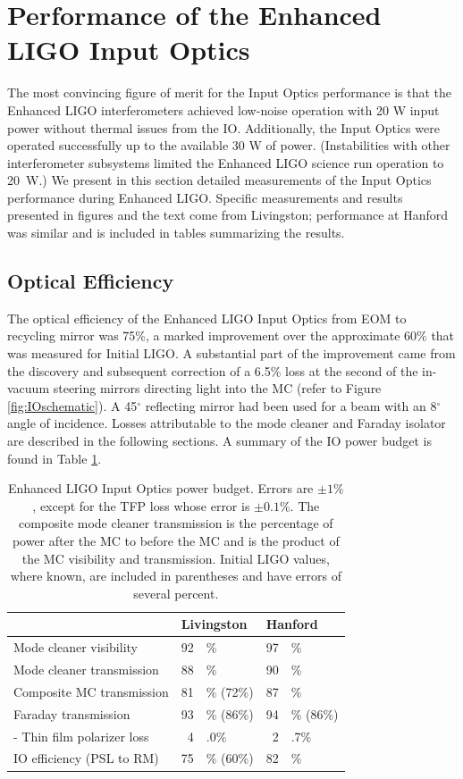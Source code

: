 \section{Performance of the Enhanced LIGO Input Optics}
\label{sec:performance}
The most convincing figure of merit for the Input Optics performance
is that the Enhanced LIGO interferometers achieved low-noise operation
with 20 W input power without thermal issues from the
IO. Additionally, the Input Optics were operated successfully up to
the available 30 W of power.  (Instabilities with other interferometer
subsystems limited the Enhanced LIGO science run operation to 20~W.)
We present in this section detailed measurements of the Input Optics
performance during Enhanced LIGO. Specific measurements and results
presented in figures and the text come from Livingston; performance at
Hanford was similar and is included in tables summarizing the results.



\subsection{Optical Efficiency}
The optical efficiency of the Enhanced LIGO Input Optics from EOM to
recycling mirror was 75\%, a marked improvement over the approximate
60\% that was measured for Initial LIGO. A substantial part of the
improvement came from the discovery and subsequent correction of a
6.5\% loss at the second of the in-vacuum steering mirrors directing
light into the MC (refer to Figure \ref{fig:IOschematic}). A 45$^\circ$
reflecting mirror had been used for a beam with an 8$^\circ$ angle of
incidence. Losses attributable to the mode cleaner and Faraday
isolator are described in the following sections. A summary of the IO
power budget is found in Table \ref{tab:pwrbudget}.

\begin{table}
\centering
\caption[Enhanced LIGO Input Optics power budget.]{Enhanced LIGO Input
  Optics power budget. Errors are $\pm 1\%$, except for the TFP loss
  whose error is $\pm 0.1\%$. The 
  composite mode cleaner transmission is the percentage of power after the MC to
  before the MC and is the product of the MC visibility and
  transmission. Initial LIGO values,
  where known, are included in parentheses and have errors of several percent.}
\begin{tabular}{l r@{}l r@{}l}
\hline
 & \multicolumn{2}{l}{Livingston} & \multicolumn{2}{l}{Hanford} \\
\hline
Mode cleaner visibility & 92 & \% & 97 & \% \\
Mode cleaner transmission & 88 & \% & 90 & \% \\
Composite MC transmission & 81 & \% (72\%) & 87 & \% \\
Faraday transmission &       93 & \% (86\%) & 94 & \% (86\%) \\
\hspace{0.5cm} - Thin film polarizer loss & 4 & .0\% & 2 & .7\% \\ 
IO efficiency (PSL to RM) & 75 & \% (60\%) & 82 & \% \\
\hline
\end{tabular}
\label{tab:pwrbudget}
\end{table}


